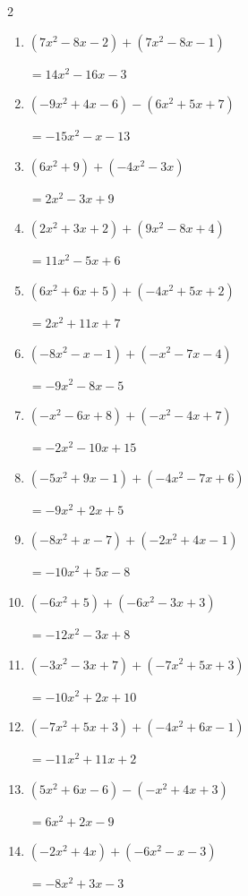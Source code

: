 \begin{multicols}{2}
\begin{enumerate}
        $=-x^{2}-18x+5$

  \item $(7x^{2}-8x-2)+(7x^{2}-8x-1)$

        $=14x^{2}-16x-3$

  \item $(-9x^{2}+4x-6)-(6x^{2}+5x+7)$

        $=-15x^{2}-x-13$

  \item $(6x^{2}+9)+(-4x^{2}-3x)$

        $=2x^{2}-3x+9$

  \item $(2x^{2}+3x+2)+(9x^{2}-8x+4)$

        $=11x^{2}-5x+6$

  \item $(6x^{2}+6x+5)+(-4x^{2}+5x+2)$

        $=2x^{2}+11x+7$

  \item $(-8x^{2}-x-1)+(-x^{2}-7x-4)$

        $=-9x^{2}-8x-5$

  \item $(-x^{2}-6x+8)+(-x^{2}-4x+7)$

        $=-2x^{2}-10x+15$

  \item $(-5x^{2}+9x-1)+(-4x^{2}-7x+6)$

        $=-9x^{2}+2x+5$

  \item $(-8x^{2}+x-7)+(-2x^{2}+4x-1)$

        $=-10x^{2}+5x-8$

  \item $(-6x^{2}+5)+(-6x^{2}-3x+3)$

        $=-12x^{2}-3x+8$

  \item $(-3x^{2}-3x+7)+(-7x^{2}+5x+3)$

        $=-10x^{2}+2x+10$

  \item $(-7x^{2}+5x+3)+(-4x^{2}+6x-1)$

        $=-11x^{2}+11x+2$

  \item $(5x^{2}+6x-6)-(-x^{2}+4x+3)$

        $=6x^{2}+2x-9$

  \item $(-2x^{2}+4x)+(-6x^{2}-x-3)$

        $=-8x^{2}+3x-3$


\end{enumerate}
\end{multicols}
